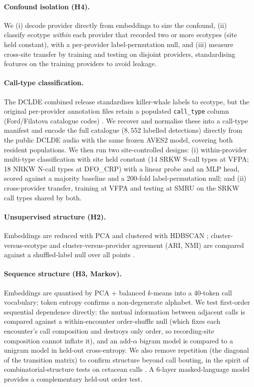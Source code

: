 \documentclass[11pt]{article}
\begin{document}
\paragraph{Confound isolation (H4).} We (i) decode provider directly from embeddings to size
the confound, (ii) classify ecotype \emph{within} each provider that recorded two or more
ecotypes (site held constant), with a per-provider label-permutation null, and (iii) measure
cross-site transfer by training and testing on disjoint providers, standardising features on
the training providers to avoid leakage.

\paragraph{Call-type classification.} The DCLDE combined release standardises killer-whale
labels to ecotype, but the original per-provider annotation files retain a populated
\texttt{call\_type} column (Ford/Filatova catalogue codes) \citep{ford1989,filatova2015}. We
recover and normalise these into a call-type manifest and encode the full catalogue
($8{,}552$ labelled detections) directly from the public DCLDE audio with the same frozen
AVES2 model, covering both resident populations. We then run two site-controlled designs:
(i) within-provider multi-type classification with site held constant (14 SRKW S-call types
at VFPA; 18 NRKW N-call types at DFO\_CRP) with a linear probe and an MLP head, scored against
a majority baseline and a 200-fold label-permutation null; and (ii) cross-provider transfer,
training at VFPA and testing at SMRU on the SRKW call types shared by both.

\paragraph{Unsupervised structure (H2).} Embeddings are reduced with PCA and clustered with
HDBSCAN \citep{mcinnes2017hdbscan}; cluster-versus-ecotype and cluster-versus-provider
agreement (ARI, NMI) are compared against a shuffled-label null over all points
\citep{sainburg2020,mcinnes2018umap}.

\paragraph{Sequence structure (H3, Markov).} Embeddings are quantised by PCA + balanced
$k$-means into a 40-token call vocabulary; token entropy confirms a non-degenerate alphabet.
We test first-order sequential dependence directly: the mutual information between adjacent
calls is compared against a within-encounter order-shuffle null (which fixes each encounter's
call composition and destroys only order, so recording-site composition cannot inflate it),
and an add-$\alpha$ bigram model is compared to a unigram model in held-out cross-entropy. We
also remove repetition (the diagonal of the transition matrix) to confirm structure beyond
call bouting, in the spirit of combinatorial-structure tests on cetacean calls
\citep{sharma2024,kershenbaum2024whyanimalstalk}. A 6-layer masked-language model
\citep{vaswani2017attention,devlin2019bert} provides a complementary held-out order test.
\end{document}

